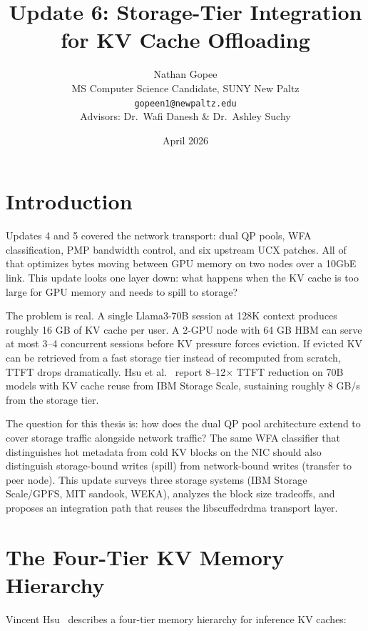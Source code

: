 \documentclass[11pt,letterpaper]{article}
\title{Update 6: Storage-Tier Integration for KV Cache Offloading}
\author{Nathan Gopee\\MS Computer Science Candidate, SUNY New Paltz\\\texttt{gopeen1@newpaltz.edu}\\[4pt]Advisors: Dr.\ Wafi Danesh \& Dr.\ Ashley Suchy}
\date{April 2026}
\begin{document}
\maketitle

\section{Introduction}

Updates 4 and 5 covered the network transport: dual QP pools, WFA classification, PMP bandwidth control, and six upstream UCX patches. All of that optimizes bytes moving between GPU memory on two nodes over a 10GbE link. This update looks one layer down: what happens when the KV cache is too large for GPU memory and needs to spill to storage?

The problem is real. A single Llama3-70B session at 128K context produces roughly 16 GB of KV cache per user. A 2-GPU node with 64 GB HBM can serve at most 3--4 concurrent sessions before KV pressure forces eviction. If evicted KV can be retrieved from a fast storage tier instead of recomputed from scratch, TTFT drops dramatically. Hsu et al.~\cite{hsu2026kv} report 8--12$\times$ TTFT reduction on 70B models with KV cache reuse from IBM Storage Scale, sustaining roughly 8 GB/s from the storage tier.

The question for this thesis is: how does the dual QP pool architecture extend to cover storage traffic alongside network traffic? The same WFA classifier that distinguishes hot metadata from cold KV blocks on the NIC should also distinguish storage-bound writes (spill) from network-bound writes (transfer to peer node). This update surveys three storage systems (IBM Storage Scale/GPFS, MIT sandook, WEKA), analyzes the block size tradeoffs, and proposes an integration path that reuses the libscuffedrdma transport layer.

\section{The Four-Tier KV Memory Hierarchy}

Vincent Hsu~\cite{hsu2026fourtier} describes a four-tier memory hierarchy for inference KV caches:
\end{document}
